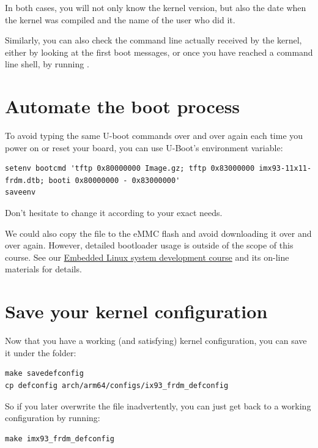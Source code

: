 In both cases, you will not only know the kernel version, but also
the date when the kernel was compiled and the name of the user who
did it.

Similarly, you can also check the command line actually received by
the kernel, either by looking at the first boot messages, or once you
have reached a command line shell, by running .

\section{Automate the boot process}

To avoid typing the same U-boot commands over and over again each time
you power on or reset your board, you can use U-Boot's 
environment variable:

{\footnotesize
\begin{verbatim}
setenv bootcmd 'tftp 0x80000000 Image.gz; tftp 0x83000000 imx93-11x11-frdm.dtb; booti 0x80000000 - 0x83000000'
saveenv
\end{verbatim}
}

Don't hesitate to change it according to your exact needs.

We could also copy the  file to the eMMC flash and avoid
downloading it over and over again. However, detailed bootloader
usage is outside of the scope of this course. See our
\href{https://bootlin.com/training/embedded-linux/}{Embedded
Linux system development course} and its on-line materials for
details.

\section{Save your kernel configuration}

Now that you have a working (and satisfying) kernel configuration, you
can save it under the  folder:

\begin{verbatim}
make savedefconfig
cp defconfig arch/arm64/configs/ix93_frdm_defconfig
\end{verbatim}

So if you later overwrite the  file inadvertently, you can
just get back to a working configuration by running:

\begin{verbatim}
make imx93_frdm_defconfig
\end{verbatim}
